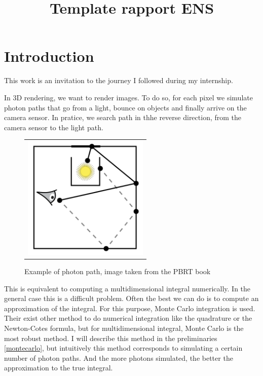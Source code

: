 \documentclass{classeENS}
\title{Template rapport ENS} %
\begin{document}

\matiere{} 
\motif{}

\tuteurpcp{}

        
\fairemarges %


\tabledematieres %

\section{Introduction}

This work is an invitation to the journey I followed during my internship. 

\par In 3D rendering, we want to render images. To do so, for each pixel 
we simulate photon paths that go from a light, bounce on objects and finally 
arrive on the camera sensor. In pratice, we search path in thhe reverse direction, 
from the camera sensor to the light path.

\begin{figure}[H]
    \centering
    \caption{Example of photon path, image taken from the PBRT book \cite{10.5555/1854996}}
    \begin{tabular}{c}
    \includegraphics[width=60mm]{image/initialPhoton.png}
    \end{tabular}
\end{figure}


\par This is equivalent to computing a multidimensional integral numerically. 
In the general case this is a difficult problem. Often the best we can do is 
to compute an approximation of the integral. For this purpose, Monte Carlo integration 
is used. Their exist other method to do numerical integration like the quadrature or 
the Newton-Cotes formula, but for multidimensional integral, Monte Carlo is the
most robust method.
I will describe this method in the preliminaries \ref{montecarlo}, 
but intuitively this method corresponds to simulating a certain 
number of photon paths. And the more photons simulated, the better 
the approximation to the true integral.
\end{document}
